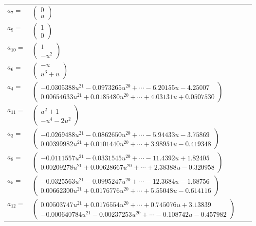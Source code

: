 \documentclass[1p]{elsarticle_modified}
\theoremstyle{definition}
\begin{document}
\begin{tabular}{m{7pt} m{180pt} m{7pt} m{180pt} }
\flushright $a_{7}=$&$\begin{pmatrix}0\\u\end{pmatrix}$ \\
\flushright $a_{9}=$&$\begin{pmatrix}1\\0\end{pmatrix}$ \\
\flushright $a_{10}=$&$\begin{pmatrix}1\\- u^2\end{pmatrix}$ \\
\flushright $a_{6}=$&$\begin{pmatrix}- u\\u^3+u\end{pmatrix}$ \\
\flushright $a_{4}=$&$\begin{pmatrix}-0.0305388 u^{21}-0.0973265 u^{20}+\cdots-6.20155 u-4.25007\\0.00654633 u^{21}+0.0185480 u^{20}+\cdots+4.03131 u+0.0507530\end{pmatrix}$ \\
\flushright $a_{11}=$&$\begin{pmatrix}u^2+1\\- u^4-2 u^2\end{pmatrix}$ \\
\flushright $a_{3}=$&$\begin{pmatrix}-0.0269488 u^{21}-0.0862650 u^{20}+\cdots-5.94433 u-3.75869\\0.00399982 u^{21}+0.0101440 u^{20}+\cdots+3.98951 u-0.419348\end{pmatrix}$ \\
\flushright $a_{8}=$&$\begin{pmatrix}-0.0111557 u^{21}-0.0331545 u^{20}+\cdots-11.4392 u+1.82405\\0.00209278 u^{21}+0.00628667 u^{20}+\cdots+2.38388 u-0.320958\end{pmatrix}$ \\
\flushright $a_{5}=$&$\begin{pmatrix}-0.0325563 u^{21}-0.0995247 u^{20}+\cdots-12.3684 u-1.68756\\0.00662300 u^{21}+0.0176776 u^{20}+\cdots+5.55048 u-0.614116\end{pmatrix}$ \\
\flushright $a_{12}=$&$\begin{pmatrix}0.00503747 u^{21}+0.0176554 u^{20}+\cdots+0.745076 u+3.13839\\-0.000640784 u^{21}-0.00237253 u^{20}+\cdots-0.108742 u-0.457982\end{pmatrix}$ \\

\end{tabular}
\end{document}
